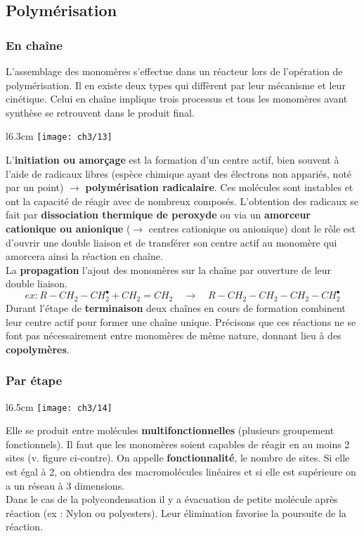 	\subsection{Polymérisation}
		\subsubsection{En chaîne}
			L'assemblage des monomères s'effectue dans un réacteur lors de l'opération de polymérisation. Il en existe deux types qui diffèrent par leur mécanisme et leur cinétique. Celui en chaîne implique trois processus et tous les monomères avant synthèse se retrouvent dans le produit final. \\
			\begin{wrapfigure}[9]{l}{6.3cm}
			\vspace{-5mm}
			\texttt{[image: ch3/13]}
			\end{wrapfigure}	
			L'\textbf{initiation ou amorçage} est la formation d'un centre actif, bien souvent à l'aide de radicaux libres (espèce chimique ayant des électrons non appariés, noté par un point) $\rightarrow$ \textbf{polymérisation radicalaire}. Ces molécules sont instables et ont la capacité de réagir avec de nombreux composés. L'obtention des radicaux se fait par \textbf{dissociation thermique de peroxyde} ou via un \textbf{amorceur cationique ou anionique} ($\rightarrow$ centres cationique ou anionique) dont le rôle est d'ouvrir une double liaison et de transférer son centre actif au monomère qui amorcera ainsi la réaction en chaîne.  \\
			La \textbf{propagation} l'ajout des monomères sur la chaîne par ouverture de leur double liaison. 
			\begin{equation}
				ex : R - CH_2 - CH_2^\bullet + CH_2 = CH_2 \quad \rightarrow \quad R - CH_2 - CH_2- CH_2 - CH_2^\bullet
			\end{equation}
			Durant l'étape de \textbf{terminaison} deux chaînes en cours de formation combinent leur centre actif pour former une chaîne unique. Précisons que ces réactions ne se font pas nécessairement entre monomères de même nature, donnant lieu à des \textbf{copolymères}. 
			
	\subsubsection{Par étape}
		\begin{wrapfigure}[5]{l}{6.5cm}
		\vspace{-5mm}
		\texttt{[image: ch3/14]}
		\end{wrapfigure}	
		Elle se produit entre molécules \textbf{multifonctionnelles} (plusieurs groupement fonctionnels). Il faut que les monomères soient capables de réagir en au moins 2 sites (v. figure ci-contre).  On appelle \textbf{fonctionnalité}, le nombre de sites. Si elle est égal à 2, on obtiendra des macromolécules linéaires et si elle est supérieure on a un réseau à 3 dimensions. \\
		Dans le cas de la polycondensation il y a évacuation de petite molécule après réaction (ex : Nylon ou polyesters). Leur élimination favorise la poursuite de la réaction. 
		
